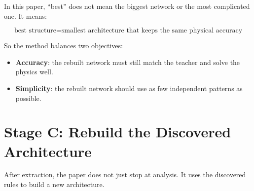 \documentclass[11pt,a4paper]{article}
\begin{document}
In this paper, ``best'' does not mean the biggest network or the most complicated one. It means:

$$
\text{best structure} = \text{smallest architecture that keeps the same physical accuracy}
$$

So the method balances two objectives:

\begin{itemize}[nosep,leftmargin=*]
    \item \textbf{Accuracy}: the rebuilt network must still match the teacher and solve the physics well.
    \item \textbf{Simplicity}: the rebuilt network should use as few independent patterns as possible.
\end{itemize}

\section{Stage C: Rebuild the Discovered Architecture}

After extraction, the paper does not just stop at analysis. It uses the discovered rules to build a new architecture.
\end{document}

